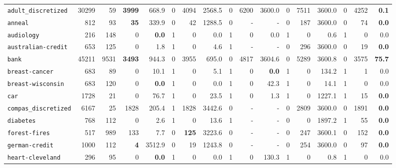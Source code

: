 \begin{tabular}{lccrrrrrrrrrrrrrr}
\texttt{adult\_discretized} & \multicolumn{1}{r}{30299} & \multicolumn{1}{r}{59}  & \textbf{3999} & 668.9 & 0 & 4094 & 2568.5 & 0 & 6200 & 3600.0 & 0 & 7511 & 3600.0 & 0 & 4252 & \textbf{0.1}\\
\texttt{anneal} & \multicolumn{1}{r}{812} & \multicolumn{1}{r}{93}  & \textbf{35} & 339.9 & 0 & 42 & 1288.5 & 0 & - & - & 0 & 187 & 3600.0 & 0 & 74 & \textbf{0.0}\\
\texttt{audiology} & \multicolumn{1}{r}{216} & \multicolumn{1}{r}{148}  & 0 & \textbf{0.0} & 1 & 0 & 0.0 & 1 & 0 & 0.0 & 1 & 0 & 0.6 & 1 & 0 & 0.0\\
\texttt{australian-credit} & \multicolumn{1}{r}{653} & \multicolumn{1}{r}{125}  & 0 & 1.8 & 1 & 0 & 4.6 & 1 & - & - & 0 & 296 & 3600.0 & 0 & 19 & \textbf{0.0}\\
\texttt{bank} & \multicolumn{1}{r}{45211} & \multicolumn{1}{r}{9531}  & \textbf{3493} & 944.3 & 0 & 3955 & 695.0 & 0 & 4817 & 3604.6 & 0 & 5289 & 3600.8 & 0 & 3575 & \textbf{75.7}\\
\texttt{breast-cancer} & \multicolumn{1}{r}{683} & \multicolumn{1}{r}{89}  & 0 & 10.1 & 1 & 0 & 5.1 & 1 & 0 & \textbf{0.0} & 1 & 0 & 134.2 & 1 & 1 & 0.0\\
\texttt{breast-wisconsin} & \multicolumn{1}{r}{683} & \multicolumn{1}{r}{120}  & 0 & \textbf{0.0} & 1 & 0 & 0.0 & 1 & 0 & 42.3 & 1 & 0 & 14.1 & 1 & 0 & 0.0\\
\texttt{car} & \multicolumn{1}{r}{1728} & \multicolumn{1}{r}{21}  & 0 & 76.7 & 1 & 0 & 23.5 & 1 & 0 & 1.3 & 1 & 0 & 1227.1 & 1 & 15 & \textbf{0.0}\\
\texttt{compas\_discretized} & \multicolumn{1}{r}{6167} & \multicolumn{1}{r}{25}  & 1828 & 205.4 & 1 & 1828 & 3442.6 & 0 & - & - & 0 & 2809 & 3600.0 & 0 & 1891 & \textbf{0.0}\\
\texttt{diabetes} & \multicolumn{1}{r}{768} & \multicolumn{1}{r}{112}  & 0 & 2.6 & 1 & 0 & 13.6 & 1 & - & - & 0 & 0 & 1897.2 & 1 & 55 & \textbf{0.0}\\
\texttt{forest-fires} & \multicolumn{1}{r}{517} & \multicolumn{1}{r}{989}  & 133 & 7.7 & 0 & \textbf{125} & 3223.6 & 0 & - & - & 0 & 247 & 3600.1 & 0 & 152 & \textbf{0.0}\\
\texttt{german-credit} & \multicolumn{1}{r}{1000} & \multicolumn{1}{r}{112}  & \textbf{4} & 3512.9 & 0 & 19 & 1243.8 & 0 & - & - & 0 & 254 & 3600.0 & 0 & 97 & \textbf{0.0}\\
\texttt{heart-cleveland} & \multicolumn{1}{r}{296} & \multicolumn{1}{r}{95}  & 0 & \textbf{0.0} & 1 & 0 & 0.0 & 1 & 0 & 130.3 & 1 & 0 & 0.8 & 1 & 0 & 0.0\\

\end{tabular}

